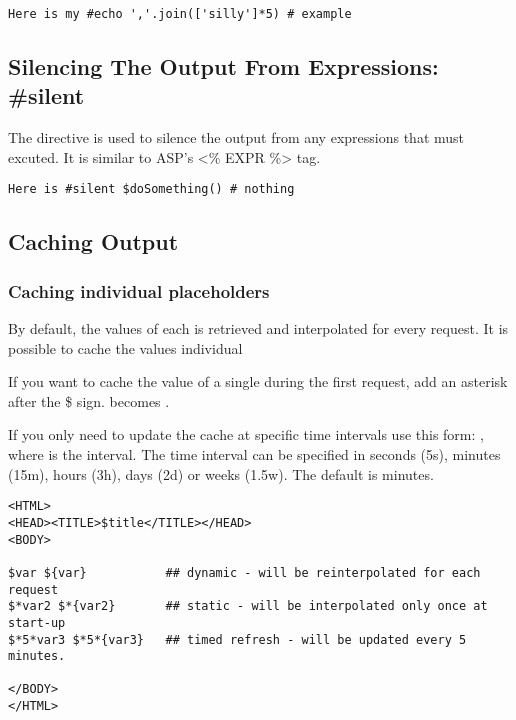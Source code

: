 \begin{verbatim}
Here is my #echo ','.join(['silly']*5) # example 
\end{verbatim}


\subsection{Silencing The Output From Expressions: \#silent}
\label{output.silent}

The  directive is used to silence the output from any expressions that
must excuted.  It is similar to ASP's <\% EXPR \%> tag.

\begin{verbatim}
Here is #silent $doSomething() # nothing
\end{verbatim}


\subsection{Caching Output}
\label{output.caching}

\subsubsection{Caching individual placeholders}
\label{output.caching.placeholders}

By default, the values of each  is retrieved and
interpolated for every request. It is possible to cache the values individual
                         
If you want to cache the value of a single  during the first
request, add an asterisk after the \$ sign.   becomes .

If you only need to update the cache at specific time intervals use this form:
 , where  is the interval.  The
time interval can be specified in seconds (5s), minutes (15m), hours (3h), days
(2d) or weeks (1.5w). The default is minutes.

\begin{verbatim}
<HTML>
<HEAD><TITLE>$title</TITLE></HEAD>
<BODY>

$var ${var}           ## dynamic - will be reinterpolated for each request
$*var2 $*{var2}       ## static - will be interpolated only once at start-up
$*5*var3 $*5*{var3}   ## timed refresh - will be updated every 5 minutes.

</BODY>
</HTML>
\end{verbatim}

